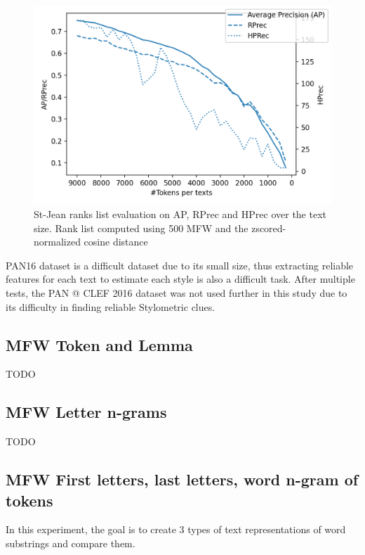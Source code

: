 \begin{figure}
  \includegraphics[width=\linewidth]{img/degradation.png}
  \caption{St-Jean ranks list evaluation on AP, RPrec and HPrec over the text size. Rank list computed using 500 MFW and the zscored-normalized cosine distance}
  \label{img:degradation}
\end{figure}

PAN16 dataset is a difficult dataset due to its small size, thus extracting reliable features for each text to estimate each style is also a difficult task.
After multiple tests, the PAN @ CLEF 2016 dataset was not used further in this study due to its difficulty in finding reliable Stylometric clues.

\subsection{MFW Token and Lemma}

TODO

\subsection{MFW Letter n-grams}

TODO

\subsection{MFW First letters, last letters, word n-gram of tokens}

In this experiment, the goal is to create 3 types of text representations of word substrings and compare them.

